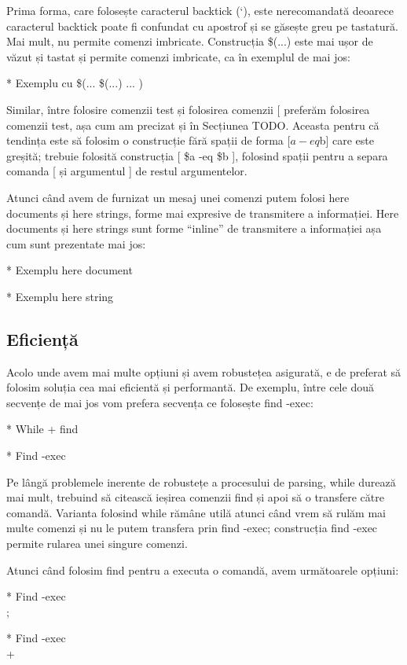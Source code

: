 Prima forma, care folosește caracterul backtick (`), este nerecomandată deoarece
caracterul backtick poate fi confundat cu apostrof și se găsește greu pe
tastatură. Mai mult, nu permite comenzi imbricate. Construcția \$(...) este mai
ușor de văzut și tastat și permite comenzi imbricate, ca în exemplul de mai jos:

* Exemplu cu \$(... \$(...) ... )

Similar, între folosire comenzii test și folosirea comenzii [ preferăm folosirea
comenzii test, așa cum am precizat și în Secțiunea TODO. Aceasta pentru că
tendința este să folosim o construcție fără spații de forma [$a -eq $b] care
este greșită; trebuie folosită construcția [ \$a -eq \$b ], folosind spații
pentru a separa comanda [ și argumentul ] de restul argumentelor.

Atunci când avem de furnizat un mesaj unei comenzi putem folosi here documents
și here strings, forme mai expresive de transmitere a informației. Here
documents și here strings sunt forme “inline” de transmitere a informației așa
cum sunt prezentate mai jos:

* Exemplu here document

* Exemplu here string

\subsection{Eficiență}
\label{sec:auto-advancedfunc-efficiency}

Acolo unde avem mai multe opțiuni și avem robustețea asigurată, e de preferat să
folosim soluția cea mai eficientă și performantă. De exemplu, între cele două
secvențe de mai jos vom prefera secvența ce folosește find -exec:

* While + find

* Find -exec

Pe lângă problemele inerente de robustețe a procesului de parsing, while durează
mai mult, trebuind să citească ieșirea comenzii find și apoi să o transfere
către comandă. Varianta folosind while rămâne utilă atunci când vrem să rulăm
mai multe comenzi și nu le putem transfera prin find -exec; construcția find
-exec permite rularea unei singure comenzi.

Atunci când folosim find pentru a executa o comandă, avem următoarele opțiuni:

* Find -exec \\;

* Find -exec \\+

